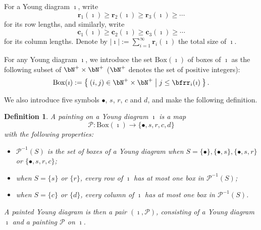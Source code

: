 \documentclass[12pt,a4paper]{amsart}
\def\abs#1{\left|{#1}\right|}
\newcommand{\CP}{{\mathcal {P}}}
\numberwithin{equation}{section}
\newtheorem{defn}[thm]{Definition}
\theoremstyle{remark}
\def\BOX{\mathrm{Box}}
\begin{document}
For a Young diagram $\imath$, write
\[
 \mathbf r_1(\imath)\geq \mathbf r_2(\imath)\geq \mathbf r_3(\imath)\geq \cdots
\]
for its row lengths, and similarly,
write
\[
 \mathbf c_1(\imath)\geq \mathbf c_2(\imath)\geq \mathbf c_3(\imath)\geq \cdots
\]
for its column lengths.
Denote by $\abs{\imath}:=\sum_{i=1}^\infty \mathbf r_i(\imath)$ the total size of $\imath$.



For any Young diagram $\imath$, we introduce the set $\BOX(\imath)$ of boxes of $\imath$ as the following subset
of $\bN^+\times \bN^+$ ($\bN^+$ denotes the set of positive integers):
\begin{equation}\label{eq:BOX}
\BOX(\imath):=\Set{(i,j)\in\bN^+\times \bN^+| j\leq \bfrr_i(\imath)}.
\end{equation}


We also introduce five symbols $\bullet$, $s$, $r$, $c$ and $d$, and make the following definition.
\begin{defn}
A painting on a Young diagram $\imath$ is a map
\[
  \CP: \mathrm{Box}(\imath) \rightarrow \{\bullet, s, r, c, d \}
\]
with the following properties:
\begin{itemize}
\item
 $\CP^{-1}(S)$ is the set of boxes of a Young diagram when $S=\{\bullet\}, \{\bullet, s \}, \{\bullet, s, r\}$ or $\{\bullet, s, r, c \} $;
 \item
 when $S=\{s\}$ or $ \{r\}$, every row of $\imath$ has at most one  box in $\CP^{-1}(S)$;
   \item
 when $S=\{c\}$ or $ \{d \}$, every column of $\imath$ has at most one  box in $\CP^{-1}(S)$.
 \end{itemize}
A painted Young diagram is then a pair $(\imath, \CP)$, consisting of a Young diagram $\imath$ and a painting $\CP$ on $\imath$.

\end{defn}
\end{document}

